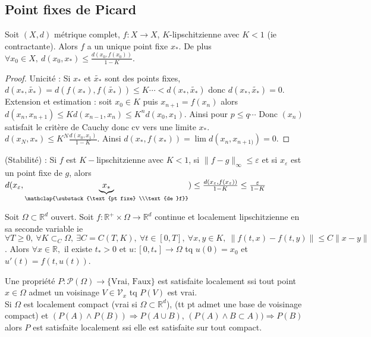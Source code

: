 \subsection{Point fixes de Picard}
\begin{propriete}
    Soit $(X,d)$ métrique complet, $f:X\to X$, $K$-lipschitzienne avec $K<1$ (ie contractante). Alors $f$ a un unique point fixe $x_*$. De plus $\forall x_0\in X,\ d(x_0,x_*)\le \frac{d(x_0,f(x_0))}{1-K}.$
\end{propriete}
\begin{proof}
    Unicité : Si $x_*$ et $\tilde{x_*}$ sont des points fixes, $d(x_*,\tilde{x_*})=d(f(x_*),f(\tilde{x_*}))\le K\cdots<d(x_*,\tilde{x_*})$ donc $d(x_*,\tilde{x_*})=0$.\\
    Extension et estimation : soit $x_0\in K$ puis $x_{n+1}=f(x_{n})$ alors $d(x_{n}, x_{n+1})\le Kd(x_{n-1},x_{n})\le K^nd(x_0,x_1)$. Ainsi pour $p\le q\cdots$
    Donc $(x_{n})$ satisfait le critère de Cauchy donc cv vers une limite $x_*.$ $d(x_N,x_*)\le K^N\frac{d(x_0,x_1)}{1-K}$. Ainsi $d(x_*,f(x_*))=\lim d(x_{n},x_{n+1)})=0$.
\end{proof}
\begin{remarque}
    (Stabilité) : Si $f$ est $K-$lipschitzienne avec $K<1$, si $\|f-g\|_\infty \le \varepsilon $ et si $x_\varepsilon $ est un point fixe de $g$, alors $d(x_\varepsilon,\underbrace{x_*}_{\mathclap{\substack{\text{pt fixe} \\\text{de }f}}})\le \frac{d(x_\varepsilon ,f(x_\varepsilon ))}{1-K}\le \frac{\varepsilon}{1-K}$
\end{remarque}
\begin{theoreme} 

Soit $\Omega\subset \mathbb{R} ^d$ ouvert. Soit $f:\mathbb{R} ^+\times \Omega\to \mathbb{R} ^d$ continue et localement lipschitzienne en sa seconde variable ie $\forall T\ge 0,\ \forall K\subset _C\Omega,\ \exists C=C(T,K),\ \forall t\in [0,T],\ \forall x,y\in K,\  \|f(t,x)-f(t,y)\|\le C\|x-y\|$. Alors $\forall x\in \mathbb{R} , $ il existe $t_*>0$ et $u:[0,t_*]\to \Omega$ tq $u(0)=x_0$ et $u'(t)=f(t,u(t))$.
\end{theoreme}
\begin{remarque}
    Une propriété $P:\mathcal{P}(\Omega)\to \{\text{Vrai, Faux}\} $ est satisfaite localement ssi tout point $x\in \Omega$ admet un voisinage $V\in \mathcal{V}_x$ tq $P(V)$ est vrai. \\Si $\Omega$ est localement compact (vrai si $\Omega\subset \mathbb{R} ^d$), (tt pt admet une base de voisinage compact) et $(P(A)\wedge P(B))\Rightarrow P(A\cup B)$, $(P(A)\wedge  B\subset A))\Rightarrow P(B)$ alors $P$ est satisfaite localement ssi elle est satisfaite sur tout compact.
\end{remarque}
